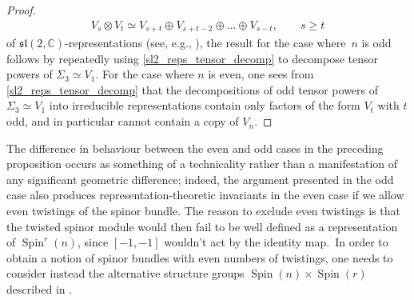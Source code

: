 \documentclass[pdftex]{sigma}
\numberwithin{equation}{section}
\newcommand{\C}{\mathbb{C}} %
\DeclareMathOperator{\Spin}{Spin}
\begin{document}
\begin{proof}
			\begin{align}\label{sl2_reps_tensor_decomp}
				V_s\otimes V_t \simeq V_{s+t}\oplus V_{s+t-2}\oplus \dots \oplus V_{s-t}, \qquad s\geq t
			\end{align}
			of $\mathfrak{sl}(2,\C)$-representations (see, e.g., \cite[Sections~11.1 and 11.2] {FultonHarris}), the result for the case where~$n$ is odd follows by repeatedly using \eqref{sl2_reps_tensor_decomp} to decompose tensor powers of $\Sigma_3 \simeq V_1$. For the case where $n$ is even, one sees from \eqref{sl2_reps_tensor_decomp} that the decompositions of odd tensor powers of $\Sigma_3\simeq V_1$ into irreducible representations contain only factors of the form $V_t$ with $t$ odd, and in particular cannot contain a copy of $V_n$.
		\end{proof}
		
		
		\begin{Remark}
			The difference in behaviour between the even and odd cases in the preceding proposition occurs as something of a technicality rather than a manifestation of any significant geometric difference; indeed, the argument presented in the odd case also produces representation-theoretic invariants in the even case if we allow even twistings of the spinor bundle. The reason to exclude even twistings is that the twisted spinor module would then fail to be well defined as a representation of $\Spin^r(n)$, since $[-1,-1]$ wouldn't act by the identity map.\ In order to obtain a notion of spinor bundles with even numbers of twistings, one needs to consider instead the alternative structure groups $\Spin(n) \times \Spin(r)$ described in \cite[Remark~2.3]{ES19}.
		\end{Remark}
		
\end{document}
